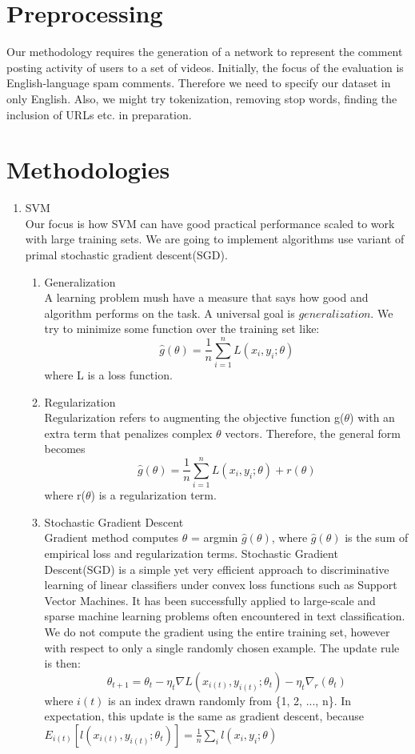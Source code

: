 \documentclass [a4paper, 11pt, oneside, final]{article}
\numberwithin{equation}{section}		%
\numberwithin{figure}{section}			%
\numberwithin{table}{section}				%
\begin{document}
\section{Preprocessing}
Our methodology requires the generation of a network to represent the comment posting activity of users to a set of videos.  Initially, the focus of the evaluation is English-language spam comments. Therefore we need to specify our dataset in only English. Also, we might try tokenization, removing stop words, finding the inclusion of URLs etc. in preparation.

\section{Methodologies}
\begin{enumerate}
\item SVM \\
Our focus is how SVM can have good practical performance scaled to work with large training sets. We are going to implement algorithms use variant of primal stochastic gradient descent(SGD).
\begin{enumerate}
\item Generalization \\
A learning problem mush have a measure that says how good and algorithm performs on the task. A universal goal is $generalization$. We try to minimize some function over the training set like: $$\hat{g}(\theta) = \frac{1}{n}\sum_{i=1}^{n} L(x_{i}, y_{i}; \theta)$$ where L is a loss function.

\item Regularization \\
Regularization refers to augmenting the objective function g($\theta$) with an extra term that penalizes complex $\theta$ vectors. Therefore, the general form becomes $$\hat{g}(\theta) = \frac{1}{n}\sum_{i=1}^{n} L(x_{i}, y_{i}; \theta) + r(\theta)$$ where r($\theta$) is a regularization term.

\item Stochastic Gradient Descent \\
Gradient method computes $\theta$ = argmin $\hat{g}(\theta)$, where $\hat{g}(\theta)$ is the sum of empirical loss and regularization terms.
Stochastic Gradient Descent(SGD) is a simple yet very efficient approach to discriminative learning of linear classifiers under convex loss functions such as Support Vector Machines. It has been successfully applied to large-scale and sparse machine learning problems often encountered in text classification. We do not compute the gradient using the entire training set, however with respect to only a single randomly chosen example. The update rule is then:
$$ \theta_{t+1} = \theta_{t} - \eta_{t} \nabla  L(x_{i(t)}, y_{i(t)}; \theta_{t}) - \eta_{t} \nabla_{r}(\theta_{t})$$ where $i(t)$ is an index drawn randomly from \{1, 2, ..., n\}.
In expectation, this update is the same as gradient descent, because $E_{i(t)}[ l(x_{i(t)}, y_{i(t)}; \theta_{t})] =  \frac{1}{n}\sum_{i} l(x_{i}, y_{i}; \theta)$ \\


\end{enumerate}
\end{enumerate}
\end{document}
